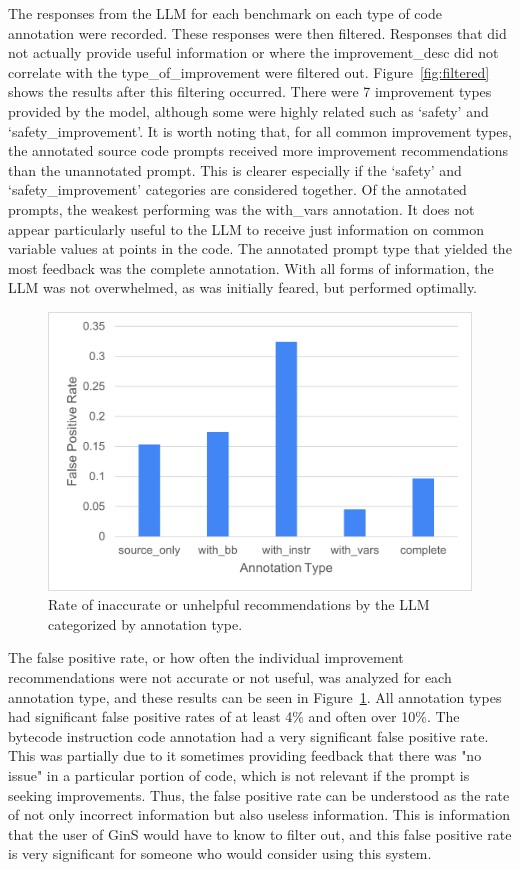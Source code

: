 \documentclass[sigconf,nonacm]{acmart}
\begin{document}
The responses from the LLM for each benchmark on each type of code annotation were recorded.
These responses were then filtered.
Responses that did not actually provide useful information or where the improvement\_desc did not correlate with the type\_of\_improvement were filtered out.
Figure~\ref{fig:filtered} shows the results after this filtering occurred.
There were 7 improvement types provided by the model, although some were highly related such as `safety' and `safety\_improvement'.
It is worth noting that, for all common improvement types, the annotated source code prompts received more improvement recommendations than the unannotated prompt.
This is clearer especially if the `safety' and `safety\_improvement' categories are considered together.
Of the annotated prompts, the weakest performing was the with\_vars annotation.
It does not appear particularly useful to the LLM to receive just information on common variable values at points in the code.
The annotated prompt type that yielded the most feedback was the complete annotation.
With all forms of information, the LLM was not overwhelmed, as was initially feared, but performed optimally.

\begin{figure}
    \centering
    \includegraphics[width=0.8\linewidth]{images/FalsePositiveRate.png}
    \caption{Rate of inaccurate or unhelpful recommendations by the LLM categorized by annotation type.}
    \label{fig:falsePositive}
\end{figure}

The false positive rate, or how often the individual improvement recommendations were not accurate or not useful, was analyzed for each annotation type, and these results can be seen in Figure~\ref{fig:falsePositive}.
All annotation types had significant false positive rates of at least 4\% and often over 10\%.
The bytecode instruction code annotation had a very significant false positive rate.
This was partially due to it sometimes providing feedback that there was "no issue" in a particular portion of code, which is not relevant if the prompt is seeking improvements.
Thus, the false positive rate can be understood as the rate of not only incorrect information but also useless information.
This is information that the user of GinS would have to know to filter out, and this false positive rate is very significant for someone who would consider using this system.
\end{document}
